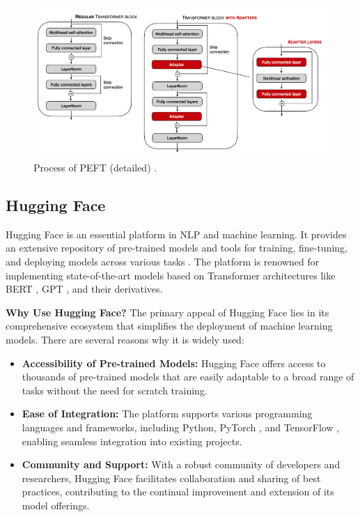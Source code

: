 \documentclass[conference]{IEEEtran}
\begin{document}
\begin{figure}[h!]
    \centering
    \includegraphics[width=.65\linewidth]{pictures/PEFT2.jpg}
    \caption[PEFT2]{Process of PEFT (detailed) \cite{Raschka2023}.}
    \label{fig:PEFT2}
\end{figure}




\subsection{Hugging Face}%
Hugging Face is an essential platform in NLP and machine learning. It provides an extensive repository of pre-trained models and tools for training, fine-tuning, and deploying models across various tasks \cite{wolf2020huggingfaces}. The platform is renowned for implementing state-of-the-art models based on Transformer architectures like BERT \cite{devlin2019bert}, GPT \cite{brown2020language}, and their derivatives.

\textbf{Why Use Hugging Face?} The primary appeal of Hugging Face lies in its comprehensive ecosystem that simplifies the deployment of machine learning models. There are several reasons why it is widely used:
\begin{itemize}
    \item \textbf{Accessibility of Pre-trained Models:} Hugging Face offers access to thousands of pre-trained models that are easily adaptable to a broad range of tasks without the need for scratch training.
    \item \textbf{Ease of Integration:} The platform supports various programming languages and frameworks, including Python, PyTorch \cite{paszke2019pytorch}, and TensorFlow \cite{tensorflow2015-whitepaper}, enabling seamless integration into existing projects.
    \item \textbf{Community and Support:} With a robust community of developers and researchers, Hugging Face facilitates collaboration and sharing of best practices, contributing to the continual improvement and extension of its model offerings.
\end{itemize}
\end{document}
